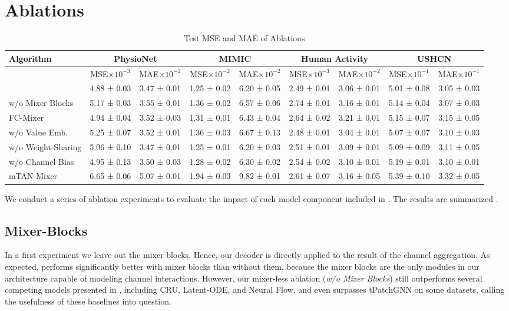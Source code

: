 \section{Ablations}

\begin{table*}
    \centering
    \caption{Test MSE and MAE of Ablations}\label{tab:abl}
    \begin{tabular}{l cc cc cc cc}
        \toprule
        Algorithm & \multicolumn{2}{c}{PhysioNet} & \multicolumn{2}{c}{MIMIC} & \multicolumn{2}{c}{Human Activity} & \multicolumn{2}{c}{USHCN} \\ 
        \midrule
        & MSE$\times 10^{-3}$ & MAE$\times 10^{-2}$ & MSE$\times 10^{-2}$ & MAE$\times 10^{-2}$ & MSE$\times 10^{-3}$ & MAE$\times 10^{-2}$ & MSE$\times 10^{-1}$ & MAE$\times 10^{-1}$ \\ 
        \midrule
        \model{} & {4.88 ± 0.03} & {3.47 ± 0.01} &  {1.25 ± 0.02} & {6.20 ± 0.05} & {2.49 ± 0.01} & {3.06  ± 0.01} & {5.01  ± 0.08} & {3.05 ± 0.03} \\ 
        \midrule
        w/o Mixer Blocks & 5.17 ± 0.03 & 3.55 ± 0.01 & 1.36 ± 0.02 & 6.57 ± 0.06 & 2.74 ± 0.01 & 3.16 ± 0.01 & 5.14 ± 0.04 &  3.07 ± 0.03 \\ 
        FC-Mixer & 4.94 ± 0.04 & 3.52 ± 0.03 & 1.31 ± 0.01 & 6.43 ± 0.04 & 2.64 ± 0.02 & 3.21 ± 0.01 & 5.15 ± 0.07 & 3.15 ± 0.05 \\
        w/o Value Emb. & 5.25 ± 0.07 & 3.52 ± 0.01 & 1.36 ± 0.03 & 6.67 ± 0.13 & 2.48 ± 0.01 & 3.04 ± 0.01 & 5.07 ± 0.07 & 3.10 ± 0.03 \\ 
        w/o Weight-Sharing & 5.06 ± 0.10 & 3.47 ± 0.01 & 1.25 ± 0.01  & 6.20 ± 0.03 & 2.51 ± 0.01 & 3.09 ± 0.01 & 5.09 ± 0.09 & 3.11 ± 0.05 \\ 
        w/o Channel Bias & 4.95 ± 0.13 & 3.50 ±  0.03 & 1.28 ± 0.02 &  6.30 ± 0.02 & 2.54 ± 0.02 & 3.10 ± 0.01 & 5.19 ±  0.01 & 3.10 ± 0.01 \\
        \midrule
        mTAN-Mixer & 6.65 ± 0.06 & 5.07 ± 0.01   & 1.94 ± 0.03 & 9.82 ± 0.01 &   2.61 ± 0.07 & 3.16 ± 0.05 & 5.39 ± 0.10 & 3.32 ± 0.05 \\
        \bottomrule
    \end{tabular}
\end{table*}
We conduct a series of ablation experiments to evaluate the impact of each model component included in \model{}.
The results are summarized .
\subsection{Mixer-Blocks}
In a first experiment we leave out the mixer blocks. Hence, our decoder is directly applied to the result of the channel aggregation. 
As expected, \model{} performs significantly better with mixer blocks than without them,
because the mixer blocks are the only modules in our architecture capable of modeling channel interactions. 
However, our mixer-less ablation (\emph{w/o Mixer Blocks}) still outperforms several competing models presented in , including CRU, Latent-ODE, and Neural Flow, and even surpasses tPatchGNN on some datasets, calling the usefulness of these baselines into question. 

